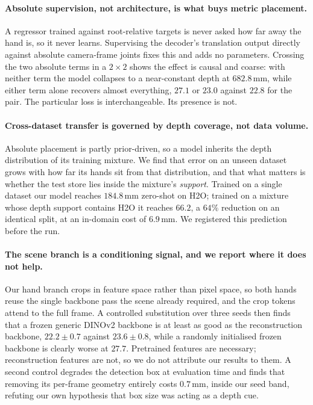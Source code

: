 \paragraph{Absolute supervision, not architecture, is what buys metric placement.}
A regressor trained against root-relative targets is never asked how far away the hand is, so it
never learns. Supervising the decoder's translation output directly against absolute camera-frame
joints fixes this and adds no parameters. Crossing the two absolute terms in a $2\times2$ shows the
effect is causal and coarse: with neither term the model collapses to a near-constant depth at
$682.8$\,mm, while either term alone recovers almost everything, $27.1$ or $23.0$ against $22.8$ for
the pair. The particular loss is interchangeable. Its presence is not.

\paragraph{Cross-dataset transfer is governed by depth coverage, not data volume.}
Absolute placement is partly prior-driven, so a model inherits the depth distribution of its
training mixture. We find that error on an unseen dataset grows with how far its hands sit from that
distribution, and that what matters is whether the test store lies inside the mixture's
\emph{support}. Trained on a single dataset our model reaches $184.8$\,mm zero-shot on H2O; trained
on a mixture whose depth support contains H2O it reaches $\mathbf{66.2}$, a $64\%$ reduction on an
identical split, at an in-domain cost of $6.9$\,mm. We registered this prediction before the run.

\paragraph{The scene branch is a conditioning signal, and we report where it does not help.}
Our hand branch crops in feature space rather than pixel space, so both hands reuse the single
backbone pass the scene already required, and the crop tokens attend to the full frame. A controlled
substitution over three seeds then finds that a frozen generic DINOv2 backbone is at least as good as
the reconstruction backbone, $22.2 \pm 0.7$ against $23.6 \pm 0.8$, while a randomly initialised
frozen backbone is clearly worse at $27.7$. Pretrained features are necessary; reconstruction
features are not, so we do not attribute our results to them. A second control degrades the detection box at evaluation time and finds that removing
its per-frame geometry entirely costs $0.7$\,mm, inside our seed band, refuting our own hypothesis
that box size was acting as a depth cue.

